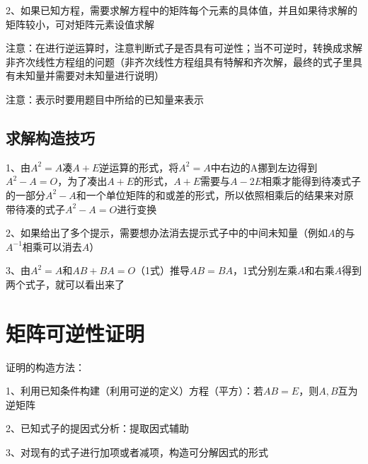 2、如果已知方程，需要求解方程中的矩阵每个元素的具体值，并且如果待求解的矩阵较小，可对矩阵元素设值求解

注意：在进行逆运算时，注意判断式子是否具有可逆性；当不可逆时，转换成求解非齐次线性方程组的问题（非齐次线性方程组具有特解和齐次解，最终的式子里具有未知量并需要对未知量进行说明）

注意：表示时要用题目中所给的已知量来表示



\subsection{求解构造技巧}

1、由$A^2=A$凑$A+E$逆运算的形式，将$A^2=A$中右边的A挪到左边得到$A^2-A=O$，为了凑出$A+E$的形式，$A+E$需要与$A-2E$相乘才能得到待凑式子的一部分$A^2-A$和一个单位矩阵的和或差的形式，所以依照相乘后的结果来对原带待凑的式子$A^2-A=O$进行变换

2、如果给出了多个提示，需要想办法消去提示式子中的中间未知量（例如$A$的与$A^{-1}$相乘可以消去$A$）

3、由$A^2=A$和$AB+BA=O$（1式）推导$AB=BA$，1式分别左乘$A$和右乘$A$得到两个式子，就可以看出来了

\section{矩阵可逆性证明}

证明的构造方法：

1、利用已知条件构建（利用可逆的定义）方程（平方）：若$AB=E$，则$A,B$互为逆矩阵

2、已知式子的提因式分析：提取因式辅助

3、对现有的式子进行加项或者减项，构造可分解因式的形式

